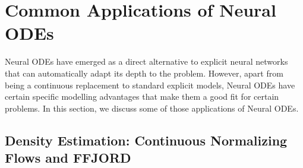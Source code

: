 \section{Common Applications of Neural ODEs}
\label{sec:neural_odes_applications}

Neural ODEs have emerged as a direct alternative to explicit neural networks that can automatically adapt its depth to the problem. However, apart from being a continuous replacement to standard explicit models, Neural ODEs have certain specific modelling advantages that make them a good fit for certain problems. In this section, we discuss some of those applications of Neural ODEs.

\subsection{Density Estimation: Continuous Normalizing Flows and FFJORD}
\label{subsec:density_estimation_neural_odes}

